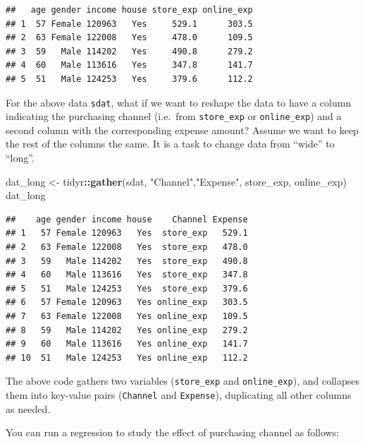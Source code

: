 \documentclass[12pt,]{krantz}
\makeatletter
\newenvironment{Shaded}{\begin{snugshade}}{\end{snugshade}}
\newcommand{\KeywordTok}[1]{\textcolor[rgb]{0.27,0.27,0.27}{\textbf{#1}}}
\newcommand{\NormalTok}[1]{#1}
\newcommand{\OperatorTok}[1]{\textcolor[rgb]{0.43,0.43,0.43}{\textbf{#1}}}
\newcommand{\StringTok}[1]{\textcolor[rgb]{0.5,0.5,0.5}{#1}}
\newenvironment{kframe}{%
\medskip{}
\setlength{\fboxsep}{.8em}
 \def\at@end@of@kframe{}%
 \ifinner\ifhmode%
  \def\at@end@of@kframe{\end{minipage}}%
  \begin{minipage}{\columnwidth}%
 \fi\fi%
 \def\FrameCommand##1{\hskip\@totalleftmargin \hskip-\fboxsep
 \colorbox{shadecolor}{##1}\hskip-\fboxsep
     \hskip-\linewidth \hskip-\@totalleftmargin \hskip\columnwidth}%
 \MakeFramed {\advance\hsize-\width
   \@totalleftmargin\z@ \linewidth\hsize
   \@setminipage}}%
 {\par\unskip\endMakeFramed%
 \at@end@of@kframe}
\renewenvironment{Shaded}{\begin{kframe}}{\end{kframe}}
\makeatother
\begin{document}
\begin{verbatim}
##   age gender income house store_exp online_exp
## 1  57 Female 120963   Yes     529.1      303.5
## 2  63 Female 122008   Yes     478.0      109.5
## 3  59   Male 114202   Yes     490.8      279.2
## 4  60   Male 113616   Yes     347.8      141.7
## 5  51   Male 124253   Yes     379.6      112.2
\end{verbatim}

For the above data \texttt{sdat}, what if we want to reshape the data to have a column indicating the purchasing channel (i.e.~from \texttt{store\_exp} or \texttt{online\_exp}) and a second column with the corresponding expense amount? Assume we want to keep the rest of the columns the same. It is a task to change data from ``wide'' to ``long''.

\begin{Shaded}
\begin{Highlighting}[]
\NormalTok{dat_long <-}\StringTok{ }\NormalTok{tidyr}\OperatorTok{::}\KeywordTok{gather}\NormalTok{(sdat, }\StringTok{"Channel"}\NormalTok{,}\StringTok{"Expense"}\NormalTok{, }
\NormalTok{                       store_exp, online_exp)}
\NormalTok{dat_long}
\end{Highlighting}
\end{Shaded}

\begin{verbatim}
##    age gender income house    Channel Expense
## 1   57 Female 120963   Yes  store_exp   529.1
## 2   63 Female 122008   Yes  store_exp   478.0
## 3   59   Male 114202   Yes  store_exp   490.8
## 4   60   Male 113616   Yes  store_exp   347.8
## 5   51   Male 124253   Yes  store_exp   379.6
## 6   57 Female 120963   Yes online_exp   303.5
## 7   63 Female 122008   Yes online_exp   109.5
## 8   59   Male 114202   Yes online_exp   279.2
## 9   60   Male 113616   Yes online_exp   141.7
## 10  51   Male 124253   Yes online_exp   112.2
\end{verbatim}

The above code gathers two variables (\texttt{store\_exp} and \texttt{online\_exp}), and collapses them into key-value pairs (\texttt{Channel} and \texttt{Expense}), duplicating all other columns as needed.

You can run a regression to study the effect of purchasing channel as follows:
\end{document}
